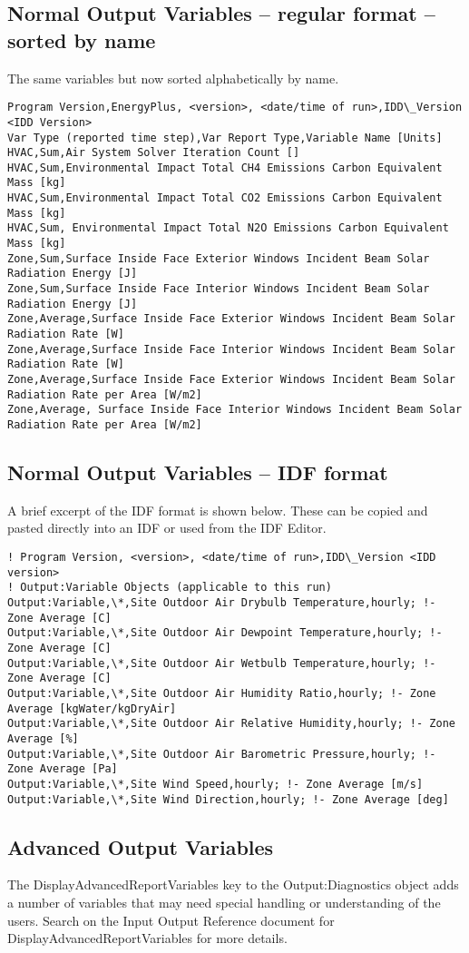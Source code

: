 \subsection{Normal Output Variables – regular format – sorted by name}

The same variables but now sorted alphabetically by name.

\begin{lstlisting}
Program Version,EnergyPlus, <version>, <date/time of run>,IDD\_Version <IDD Version>
Var Type (reported time step),Var Report Type,Variable Name [Units]
HVAC,Sum,Air System Solver Iteration Count []
HVAC,Sum,Environmental Impact Total CH4 Emissions Carbon Equivalent Mass [kg]
HVAC,Sum,Environmental Impact Total CO2 Emissions Carbon Equivalent Mass [kg]
HVAC,Sum, Environmental Impact Total N2O Emissions Carbon Equivalent Mass [kg]
Zone,Sum,Surface Inside Face Exterior Windows Incident Beam Solar Radiation Energy [J]
Zone,Sum,Surface Inside Face Interior Windows Incident Beam Solar Radiation Energy [J]
Zone,Average,Surface Inside Face Exterior Windows Incident Beam Solar Radiation Rate [W]
Zone,Average,Surface Inside Face Interior Windows Incident Beam Solar Radiation Rate [W]
Zone,Average,Surface Inside Face Exterior Windows Incident Beam Solar Radiation Rate per Area [W/m2]
Zone,Average, Surface Inside Face Interior Windows Incident Beam Solar Radiation Rate per Area [W/m2]
\end{lstlisting}

\subsection{Normal Output Variables – IDF format}

A brief excerpt of the IDF format is shown below. These can be copied and pasted directly into an IDF or used from the IDF Editor.

\begin{lstlisting}
! Program Version, <version>, <date/time of run>,IDD\_Version <IDD version>
! Output:Variable Objects (applicable to this run)
Output:Variable,\*,Site Outdoor Air Drybulb Temperature,hourly; !- Zone Average [C]
Output:Variable,\*,Site Outdoor Air Dewpoint Temperature,hourly; !- Zone Average [C]
Output:Variable,\*,Site Outdoor Air Wetbulb Temperature,hourly; !- Zone Average [C]
Output:Variable,\*,Site Outdoor Air Humidity Ratio,hourly; !- Zone Average [kgWater/kgDryAir]
Output:Variable,\*,Site Outdoor Air Relative Humidity,hourly; !- Zone Average [%]
Output:Variable,\*,Site Outdoor Air Barometric Pressure,hourly; !- Zone Average [Pa]
Output:Variable,\*,Site Wind Speed,hourly; !- Zone Average [m/s]
Output:Variable,\*,Site Wind Direction,hourly; !- Zone Average [deg]
\end{lstlisting}

\subsection{Advanced Output Variables}

The DisplayAdvancedReportVariables key to the Output:Diagnostics object adds a number of variables that may need special handling or understanding of the users. Search on the Input Output Reference document for DisplayAdvancedReportVariables for more details.
